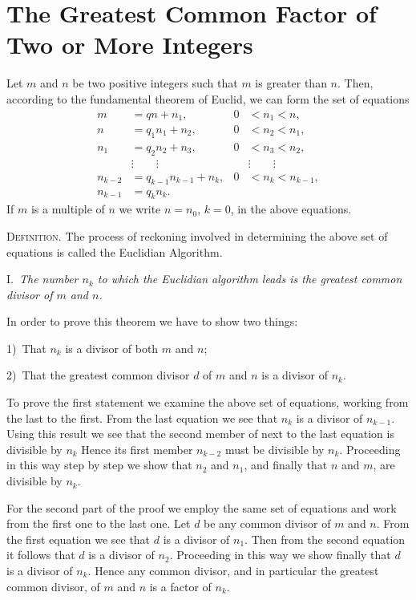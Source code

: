 \documentclass[oneside]{book}
\begin{document}
\section{The Greatest Common Factor of Two or More
Integers}\label{s9}%
%

Let $m$ and $n$ be two positive integers such that $m$ is greater
than $n$. Then, according to the fundamental theorem of Euclid, we
can form the set of equations
\begin{align*}
m         &= qn + n_1,                & 0 &< n_1 < n,   \\
n         &= q_1 n_1 + n_2,           & 0 &< n_2 < n_1, \\
n_1       &= q_2 n_2 + n_3,           & 0 &< n_3 < n_2, \\
&\vdots \qquad \vdots &&\vdots \qquad \vdots \\
n_{k - 2} &= q_{k - 1} n_{k-1} + n_k, & 0 &< n_k < n_{k - 1}, \\
n_{k - 1} &= q _k n_k.                &   &
\end{align*}
If $m$ is a multiple of $n$ we write $n = n_0$, $k = 0$, in the
above equations.

\smallskip \textsc{Definition.} The process of reckoning involved in
determining the above set of equations is called the Euclidian
Algorithm.

\smallskip I.~\emph{The number $n_k$ to which the Euclidian
algorithm leads is the greatest common divisor of $m$ and $n$.}

In order to prove this theorem we have to show two things:

1)~That $n_k$ is a divisor of both $m$ and $n$;

2)~That the greatest common divisor $d$ of $m$ and $n$ is a divisor
of $n_k$.

To prove the first statement we examine the above set of equations,
working from the last to the first. From the last equation we see
that $n_k$ is a divisor of $n_{k-1}$. Using this result we see that
the second member of next to the last equation is divisible by $n_k$
Hence its first member $n_{k-2}$ must be divisible by $n_k$.
Proceeding in this way step by step we show that $n_2$ and $n_1$,
and finally that $n$ and $m$, are divisible by $n_k$.

For the second part of the proof we employ the same set of equations
and work from the first one to the last one. Let $d$ be any common
divisor of $m$ and $n$. From the first equation we see that $d$ is a
divisor of $n_1$. Then from the second equation it follows that $d$
is a divisor of $n_2$. Proceeding in this way we show finally that
$d$ is a divisor of $n_k$. Hence any common divisor, and in
particular the greatest common divisor, of $m$ and $n$ is a factor
of $n_k$.
\end{document}
